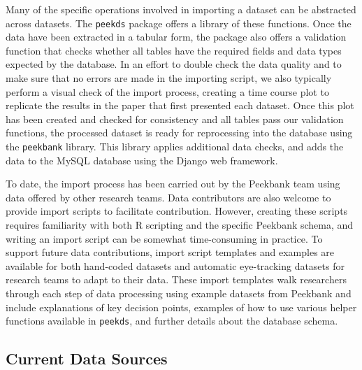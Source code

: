 \documentclass[
  english,
  man,floatsintext]{apa6}
\begin{document}
Many of the specific operations involved in importing a dataset can be abstracted across datasets.
The \texttt{peekds} package offers a library of these functions.
Once the data have been extracted in a tabular form, the package also offers a validation function that checks whether all tables have the required fields and data types expected by the database.
In an effort to double check the data quality and to make sure that no errors are made in the importing script, we also typically perform a visual check of the import process, creating a time course plot to replicate the results in the paper that first presented each dataset.
Once this plot has been created and checked for consistency and all tables pass our validation functions, the processed dataset is ready for reprocessing into the database using the \texttt{peekbank} library.
This library applies additional data checks, and adds the data to the MySQL database using the Django web framework.

To date, the import process has been carried out by the Peekbank team using data offered by other research teams.
Data contributors are also welcome to provide import scripts to facilitate contribution.
However, creating these scripts requires familiarity with both R scripting and the specific Peekbank schema, and writing an import script can be somewhat time-consuming in practice.
To support future data contributions, import script templates and examples are available for both hand-coded datasets and automatic eye-tracking datasets for research teams to adapt to their data.
These import templates walk researchers through each step of data processing using example datasets from Peekbank and include explanations of key decision points, examples of how to use various helper functions available in \texttt{peekds}, and further details about the database schema.

\hypertarget{current-data-sources}{%
\subsection{Current Data Sources}\label{current-data-sources}}
\end{document}
